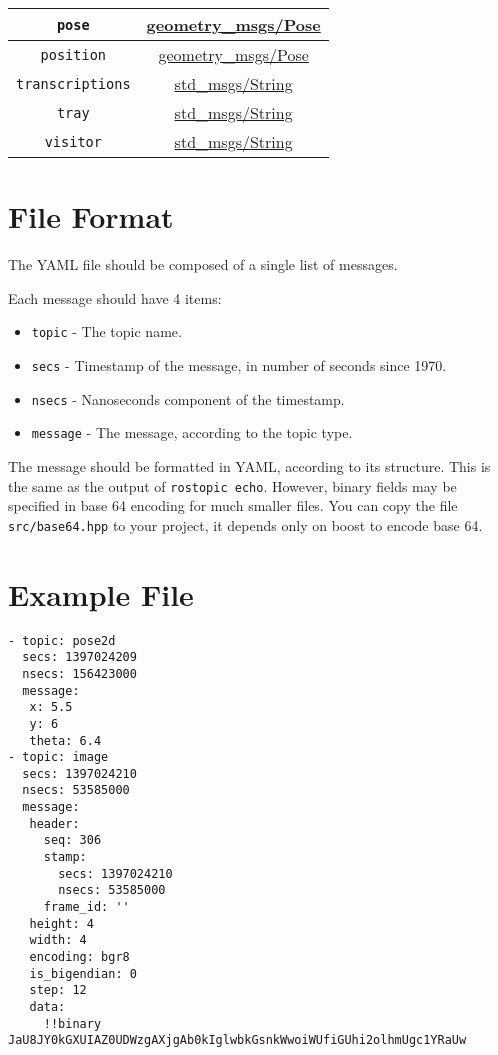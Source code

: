 \documentclass[a4paper]{article}
\begin{document}
\begin{center}
\begin{tabular}{|c|c|}
\verb!pose! & \href{http://docs.ros.org/api/geometry\_msgs/html/msg/Pose.html}{geometry\_msgs/Pose} \\\hline
\verb!position! & \href{http://docs.ros.org/api/geometry\_msgs/html/msg/Pose.html}{geometry\_msgs/Pose} \\\hline
\verb!transcriptions! & \href{http://docs.ros.org/api/std\_msgs/html/msg/String.html}{std\_msgs/String} \\\hline
\verb!tray! & \href{http://docs.ros.org/api/std\_msgs/html/msg/String.html}{std\_msgs/String} \\\hline
\verb!visitor! & \href{http://docs.ros.org/api/std\_msgs/html/msg/String.html}{std\_msgs/String} \\\hline
\end{tabular}
\end{center}


\section{File Format}

The YAML file should be composed of a single list of messages.

Each message should have 4 items:
\begin{itemize}
 \item \verb!topic! - The topic name.
 \item \verb!secs! - Timestamp of the message, in number of seconds since 1970.
 \item \verb!nsecs! - Nanoseconds component of the timestamp.
 \item \verb!message! - The message, according to the topic type.
\end{itemize}

The message should be formatted in YAML, according to its structure. This is the same as the output of \verb!rostopic echo!. However, binary fields may be specified in
base 64 encoding for much smaller files. You can copy the file \verb!src/base64.hpp! to your project, it depends only on boost to encode base 64.


\section{Example File}

\begin{verbatim}
- topic: pose2d
  secs: 1397024209
  nsecs: 156423000
  message:
   x: 5.5
   y: 6
   theta: 6.4
- topic: image
  secs: 1397024210
  nsecs: 53585000
  message:
   header:
     seq: 306
     stamp:
       secs: 1397024210
       nsecs: 53585000
     frame_id: ''
   height: 4
   width: 4
   encoding: bgr8
   is_bigendian: 0
   step: 12
   data:
     !!binary JaU8JY0kGXUIAZ0UDWzgAXjgAb0kIglwbkGsnkWwoiWUfiGUhi2olhmUgc1YRaUw
\end{verbatim}
\end{document}
